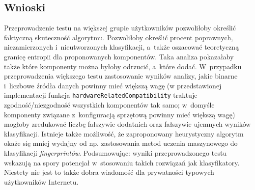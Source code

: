 \subsection{Wnioski}
Przeprowadzenie testu na większej grupie użytkowników pozwoliłoby określić
faktyczną skuteczność algorytmu. Pozwoliłoby określić procent poprawnych,
niezamierzonych i~nieutworzonych klasyfikacji, a~także oszacować teoretyczną
granicę entropii dla proponowanych komponentów. Taka analiza pokazałaby także
które komponenty można byłoby odrzucić, a~które dodać. W~przypadku
przeprowadzenia większego testu zastosowanie wyników analizy, jakie binarne
i~liczbowe źródła danych powinny mieć większą wagę (w przedstawionej
implementacji funkcja \texttt{hardwareRelatedCompatibility} traktuje
zgodność/niezgodność wszystkich komponentów tak samo; w~domyśle komponenty
związane z~konfiguracją sprzętową powinny mieć większą wagę) mogłoby zredukować
liczbę fałszywie dodatnich oraz fałszywie ujemnych wyników klasyfikacji.
Istnieje także możliwość, że zaproponowany heurystyczny algorytm okaże się mniej
wydajny od np. zastosowania metod uczenia maszynowego do klasyfikacji
\emph{fingerprintów}. Podsumowując: wyniki przeprowadzonego testu wskazują na
spory potencjał w~stosowaniu takich rozwiązań jak klasyfikatory. Niestety nie
jest to także dobra wiadomość dla prywatności typowych użytkowników Internetu.
